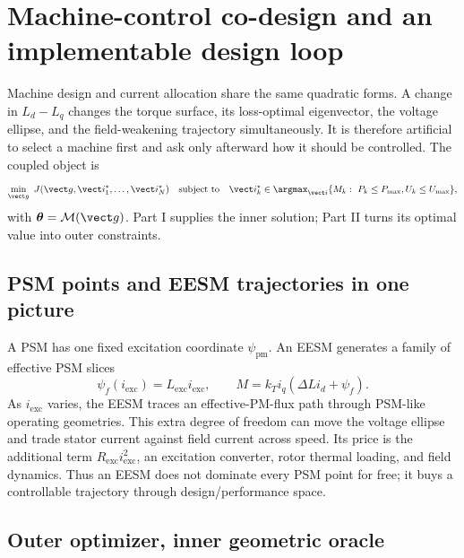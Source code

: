 \section{Machine-control co-design and an implementable design loop}
\label{sec:codesign}

Machine design and current allocation share the same quadratic forms.  A
change in \(L_d-L_q\) changes the torque surface, its loss-optimal eigenvector,
the voltage ellipse, and the field-weakening trajectory simultaneously.  It is
therefore artificial to select a machine first and ask only afterward how it
should be controlled.  The coupled object is
\begin{equation}
 \min_{\vect g}\ J(\vect g,\vect i_1^\star,\ldots,\vect i_N^\star)
 \quad\text{subject to}\quad
 \vect i_k^\star\in\argmax_{\vect i}\{M_k:\ P_k\leq P_{\max},
 U_k\leq U_{\max}\},
 \label{eq:machine-control-codesign}
\end{equation}
with \(\boldsymbol\theta=\mathcal M(\vect g)\).  Part I supplies the inner
solution; Part II turns its optimal value into outer constraints.

\subsection{PSM points and EESM trajectories in one picture}

A PSM has one fixed excitation coordinate \(\psi_{\mathrm{pm}}\).  An EESM
generates a family of effective PSM slices
\begin{equation}
 \psi_f(i_{\mathrm{exc}})=L_{\mathrm{exc}}i_{\mathrm{exc}},
 \qquad
 M=k_Ti_q(\Delta L i_d+\psi_f).
 \label{eq:effective-pm-trajectory}
\end{equation}
As \(i_{\mathrm{exc}}\) varies, the EESM traces an effective-PM-flux path
through PSM-like operating geometries.  This extra degree of freedom can move
the voltage ellipse and trade stator current against field current across
speed.  Its price is the additional term
\(R_{\mathrm{exc}}i_{\mathrm{exc}}^2\), an excitation converter, rotor thermal
loading, and field dynamics.  Thus an EESM does not dominate every PSM point
for free; it buys a controllable trajectory through design/performance space.

\subsection{Outer optimizer, inner geometric oracle}

